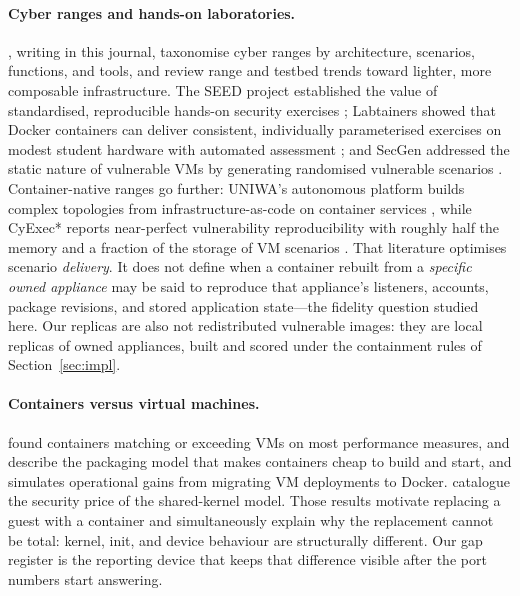 \documentclass[3p,twocolumn,authoryear]{elsarticle}
\begin{document}
\paragraph{Cyber ranges and hands-on laboratories.}
\citet{yamin2020}, writing in this journal, taxonomise cyber ranges by
architecture, scenarios, functions, and tools, and \citet{ukwandu2020}
review range and testbed trends toward lighter, more composable
infrastructure. The SEED project established the value of standardised,
reproducible hands-on security exercises \citep{du2007}; Labtainers
showed that Docker containers can deliver consistent, individually
parameterised exercises on modest student hardware with automated
assessment \citep{thompson2018}; and SecGen addressed the static nature
of vulnerable VMs by generating randomised vulnerable scenarios
\citep{schreuders2017}. Container-native ranges go further:
UNIWA's autonomous platform builds complex topologies from
infrastructure-as-code on container services \citep{chouliaras2023},
while CyExec* reports near-perfect vulnerability reproducibility with
roughly half the memory and a fraction of the storage of VM scenarios
\citep{nakata2021}. That literature optimises scenario
\emph{delivery}. It does not define when a container rebuilt from a
\emph{specific owned appliance} may be said to reproduce that
appliance's listeners, accounts, package revisions, and stored
application state---the fidelity question studied here. Our replicas
are also not redistributed vulnerable images: they are local replicas
of owned appliances, built and scored under the containment rules of
Section~\ref{sec:impl}.

\paragraph{Containers versus virtual machines.}
\citet{felter2015} found containers matching or exceeding VMs on most
performance measures, \citet{bernstein2014} and \citet{merkel2014}
describe the packaging model that makes containers cheap to build and
start, and \citet{naik2016} simulates operational gains from migrating
VM deployments to Docker. \citet{sultan2019} catalogue the security
price of the shared-kernel model. Those results motivate replacing a
guest with a container and simultaneously explain why the replacement
cannot be total: kernel, init, and device behaviour are structurally
different. Our gap register is the reporting device that keeps that
difference visible after the port numbers start answering.
\end{document}
